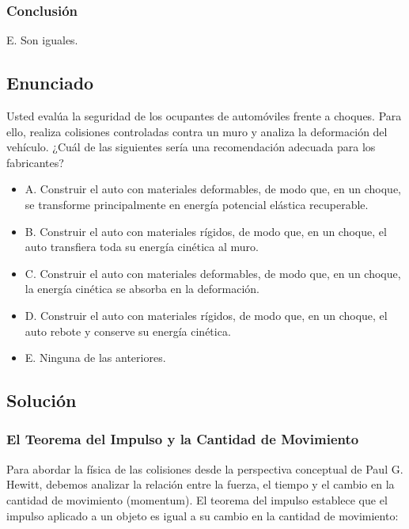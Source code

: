 \documentclass[12pt, a4paper]{article}
\begin{document}
\subsubsection*{Conclusión}

E. Son iguales.

\newpage

\subsection*{Enunciado}

 Usted evalúa la seguridad de los ocupantes de automóviles frente a choques. Para ello, realiza colisiones controladas contra un muro y analiza la deformación del vehículo. ¿Cuál de las siguientes sería una recomendación adecuada para los fabricantes?

\begin{itemize}
    \item A. Construir el auto con materiales deformables, de modo que, en un choque, se transforme principalmente en energía potencial elástica recuperable.
    \item B. Construir el auto con materiales rígidos, de modo que, en un choque, el auto transfiera toda su energía cinética al muro.
    \item C. Construir el auto con materiales deformables, de modo que, en un choque, la energía cinética se absorba en la deformación.
    \item D. Construir el auto con materiales rígidos, de modo que, en un choque, el auto rebote y conserve su energía cinética.
    \item E. Ninguna de las anteriores.
\end{itemize}

\subsection*{Solución}

\subsubsection*{El Teorema del Impulso y la Cantidad de Movimiento}

Para abordar la física de las colisiones desde la perspectiva conceptual de Paul G. Hewitt, debemos analizar la relación entre la fuerza, el tiempo y el cambio en la cantidad de movimiento (momentum). El teorema del impulso establece que el impulso aplicado a un objeto es igual a su cambio en la cantidad de movimiento:
\end{document}

